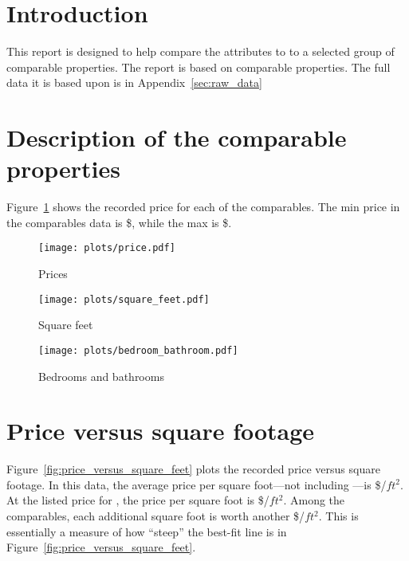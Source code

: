 \documentclass[
10pt, %
a4paper, %
oneside, %
headinclude,footinclude, %
BCOR5mm, %
]{scrartcl}
\begin{document}

\section{Introduction}
This report is designed to help compare the attributes to \PropertyName{} to a selected group of comparable properties. 
The report is based on \NumberOfComps{} comparable properties.
The full data it is based upon is in Appendix~\ref{sec:raw_data} 

\section{Description of the comparable properties}

Figure~\ref{fig:price} shows the recorded price for each of the comparables.
The min price in the comparables data is \$\MinPrice{}, while the max is \$\MaxPrice{}.

\begin{figure}[tb]
\centering
\caption{Prices} \label{fig:price}  
\texttt{[image: plots/price.pdf]} 
\end{figure}


\begin{figure}[tb]
\centering
\caption{Square feet} \label{fig:square_feet}  
\texttt{[image: plots/square\_feet.pdf]} 
\end{figure}

\begin{figure}[tb]
\centering
\caption{Bedrooms and bathrooms} \label{fig:bedroom_bathroom}  
\texttt{[image: plots/bedroom\_bathroom.pdf]} 
\end{figure}


\section{Price versus square footage}

Figure~\ref{fig:price_versus_square_feet} plots the recorded price versus square footage.
In this data, the average price per square foot---not including \PropertyName{}---is \$\MeanPricePerFoot{}/$ft^2$.
At the listed price for \PropertyName{}, the price per square foot is \$\MeanPricePerFootFocal{}/$ft^2$.
Among the comparables, each additional square foot is worth another \$\MarginalPricePerFoot{}/$ft^2$. 
This is essentially a measure of how ``steep'' the best-fit line is in Figure~\ref{fig:price_versus_square_feet}.
\end{document}
